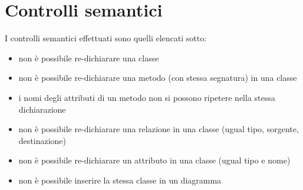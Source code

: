 \section{Controlli semantici}

I controlli semantici effettuati sono quelli elencati sotto:
\begin{itemize}
   \item non è possibile re-dichiarare una classe
   \item non è possibile re-dichiarare una metodo (con stessa segnatura) in una
   classe
   \item i nomi degli attributi di un metodo non si possono ripetere nella stessa dichiarazione
   \item non è possibile re-dichiarare una relazione in una classe (ugual tipo,
   sorgente, destinazione)
   \item non è possibile re-dichiarare un attributo in una classe (ugual tipo e
   nome)
   \item non è possibile inserire la stessa classe in un diagramma 
\end{itemize}
